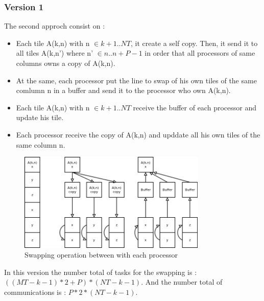 \documentclass{report}
\begin{document}
\subsubsection*{Version 1}
The second approch consist on :
\begin{itemize}
\item Each tile A(k,n) with n $\in k+1..NT$, it create a self copy. Then, it send it to all tiles A(k,n') where n' $\in n..n+P-1$ in order that all processors of same columns owns a copy of A(k,n).
\item At the same, each processor put the line to swap of his own tiles of the same comlumn n in a buffer and send it to the processor who own A(k,n).
\item Each tile A(k,n) with n $\in k+1..NT$ receive the buffer of each processor and update his tile.
\item Each processor receive the copy of A(k,n) and upddate all his own tiles of the same column n.
\end{itemize} 
\begin{figure}[!ht]
\begin{center}
\includegraphics[width=0.8\textwidth]{version1.png} 
\end{center}
\caption{Swapping operation between with each processor}
\end{figure}
In this version the number total of tasks for the swapping is : $((MT-k-1)*2+P)*(NT-k-1)$.
And the number total of communications is : $P*2*(NT-k-1)$.
\end{document}
